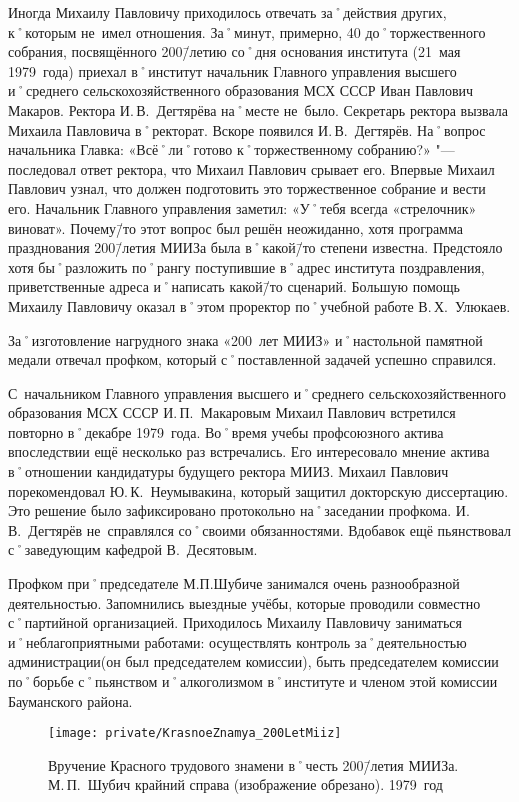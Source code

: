 Иногда Михаилу Павловичу приходилось отвечать за˚действия других, к˚которым не~имел отношения. За˚минут, примерно, 40 до˚торжественного собрания, посвящённого 200\=/летию со˚дня основания института (21~мая 1979~года) приехал в˚институт начальник Главного управления высшего и˚среднего сельскохозяйственного образования МСХ СССР Иван Павлович Макаров. Ректора И.\,В.~Дегтярёва на˚месте не~было. Секретарь ректора вызвала Михаила Павловича в˚ректорат. Вскоре появился И.\,В.~Дегтярёв. На˚вопрос начальника Главка: «Всё˚ли˚готово к˚торжественному собранию?» "--- последовал ответ ректора, что Михаил Павлович срывает его. Впервые Михаил Павлович узнал, что должен подготовить это торжественное собрание и вести его. Начальник Главного управления заметил: «У˚тебя всегда «стрелочник» виноват». Почему\=/то этот вопрос был решён неожиданно, хотя программа празднования 200\=/летия МИИЗа была в˚какой\=/то степени известна. Предстояло хотя бы˚разложить по˚рангу поступившие в˚адрес института поздравления, приветственные адреса и˚написать какой\=/то сценарий. Большую помощь Михаилу Павловичу оказал в˚этом проректор по˚учебной работе В.\,Х.~Улюкаев.

За˚изготовление нагрудного знака «200~лет МИИЗ» и˚настольной памятной медали отвечал профком, который с˚поставленной задачей успешно справился.

С~начальником Главного управления высшего и˚среднего сельскохозяйственного образования МСХ СССР И.\,П.~Макаровым Михаил Павлович встретился повторно в˚декабре 1979~года. Во˚время учебы профсоюзного актива впоследствии ещё несколько раз встречались. Его интересовало мнение актива в˚отношении кандидатуры будущего ректора МИИЗ. Михаил Павлович порекомендовал Ю.\,К.~Неумывакина, который защитил докторскую диссертацию. Это решение было зафиксировано протокольно на˚заседании профкома. И.\,В.~Дегтярёв не~справлялся со˚своими обязанностями. Вдобавок ещё пьянствовал с˚заведующим кафедрой В.~Десятовым.

Профком при˚председателе М.П.Шубиче занимался очень разнообразной деятельностью. Запомнились выездные учёбы, которые проводили совместно с˚партийной организацией. Приходилось Михаилу Павловичу заниматься и˚неблагоприятными работами: осуществлять контроль за˚деятельностью администрации(он был председателем комиссии), быть председателем комиссии по˚борьбе с˚пьянством и˚алкоголизмом в˚институте и членом этой комиссии Бауманского района.

\begin{figure}[h]
\texttt{[image: private/KrasnoeZnamya\_200LetMiiz]}
\caption[Вручение Красного трудового знамени в˚честь 200\=/летия \mbox{МИИЗа}. М.\,П.~Шубич крайний справа (изображение обрезано). 1979~год]{Вручение Красного трудового знамени в˚честь 200\=/летия \mbox{МИИЗа}. М.\,П.~Шубич крайний справа (изображение обрезано). 1979~год\footnotemark}
\label{fig:KrasnoeZnamya_200LetMiiz}
\end{figure}

